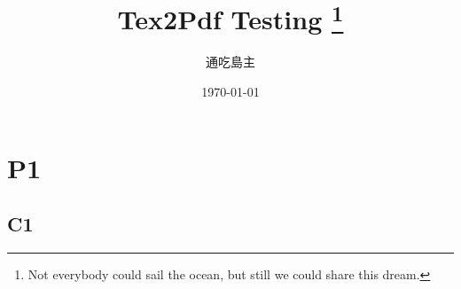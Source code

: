 \setmainfont{DejaVu Sans}
\setsansfont{DejaVu Sans}
\setmonofont{DejaVu Sans Mono}

\newcommand\ytl[2]{\parbox[b]{8em}{\hfill{\color{cyan}\bfseries\sffamily #1}~$\cdots\cdots$~}\makebox[0pt][c]{$\bullet$}\vrule\quad \parbox[c]{10cm}{\vspace{7pt}\color{red!40!black!80}\raggedright\sffamily #2.\\[7pt]}\\[-3pt]}

\title{Tex2Pdf Testing \footnote{Not everybody could sail the ocean, but still we could share this dream.}}
\author{通吃島主}
\date{\today}


    \maketitle

    

    \tableofcontents
    \listoffigures
    \listoftables

    \mainmatter
    \part{P1}
        \chapter{C1}
        
        
        
    


